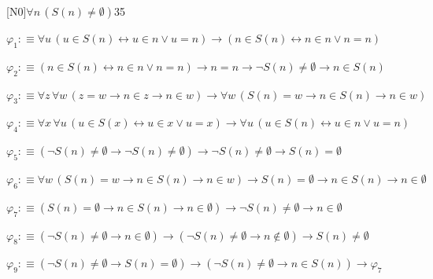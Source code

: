 \begin{fullproof}{[N0]}{$\forall n\,(S(n) \neq \emptyset)$}{35}
\begin{ptree}
\end{ptree}
\begin{abbrevlist}
\item $\varphi_{1} :\equiv \forall u\,(u \in S(n) \leftrightarrow u \in n \lor u = n) \to (n \in S(n) \leftrightarrow n \in n \lor n = n)$
\item $\varphi_{2} :\equiv (n \in S(n) \leftrightarrow n \in n \lor n = n) \to n = n \to \neg S(n) \neq \emptyset \to n \in S(n)$
\item $\varphi_{3} :\equiv \forall z\,\forall w\,(z = w \to n \in z \to n \in w) \to \forall w\,(S(n) = w \to n \in S(n) \to n \in w)$
\item $\varphi_{4} :\equiv \forall x\,\forall u\,(u \in S(x) \leftrightarrow u \in x \lor u = x) \to \forall u\,(u \in S(n) \leftrightarrow u \in n \lor u = n)$
\item $\varphi_{5} :\equiv (\neg S(n) \neq \emptyset \to \neg S(n) \neq \emptyset) \to \neg S(n) \neq \emptyset \to S(n) = \emptyset$
\item $\varphi_{6} :\equiv \forall w\,(S(n) = w \to n \in S(n) \to n \in w) \to S(n) = \emptyset \to n \in S(n) \to n \in \emptyset$
\item $\varphi_{7} :\equiv (S(n) = \emptyset \to n \in S(n) \to n \in \emptyset) \to \neg S(n) \neq \emptyset \to n \in \emptyset$
\item $\varphi_{8} :\equiv (\neg S(n) \neq \emptyset \to n \in \emptyset) \to (\neg S(n) \neq \emptyset \to n \notin \emptyset) \to S(n) \neq \emptyset$
\item $\varphi_{9} :\equiv (\neg S(n) \neq \emptyset \to S(n) = \emptyset) \to (\neg S(n) \neq \emptyset \to n \in S(n)) \to \varphi_{7}$
\end{abbrevlist}
\end{fullproof}

